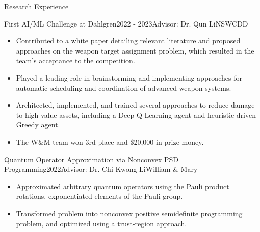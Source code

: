 \begin{rSection}{Research Experience}
\begin{rSubsection}{First AI/ML Challenge at Dahlgren}{2022 - 2023}{Advisor: Dr. Qun Li}{\small NSWCDD}
\begin{itemize}
\item Contributed to a white paper detailing relevant literature and proposed approaches on the weapon target assignment problem, which resulted in the team's acceptance to the competition.
\item Played a leading role in brainstorming and implementing approaches for automatic scheduling and coordination of advanced weapon systems.
\item Architected, implemented, and trained several approaches to reduce damage to high value assets, including a Deep Q-Learning agent and heuristic-driven Greedy agent.
\item The W\&M team won 3rd place and \$20,000 in prize money. 
\end{itemize}
\end{rSubsection}

\begin{rSubsection}{Quantum Operator Approximation via Nonconvex PSD Programming}{2022}{Advisor: Dr. Chi-Kwong Li}{\small William \& Mary}
\begin{itemize}
\item Approximated arbitrary quantum operators using the Pauli product rotations, exponentiated elements of the Pauli group. 
\item Transformed problem into nonconvex positive semidefinite programming problem, and optimized using a trust-region approach.
\end{itemize}
\end{rSubsection}

\end{rSection}